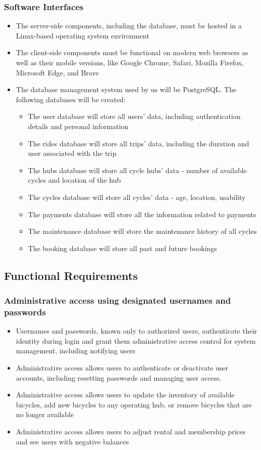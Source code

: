 \documentclass[11pt]{article}
\begin{document}
\subsubsection{Software Interfaces}
\begin{itemize}
    \item The server-side components, including the database, must be hosted in a Linux-based operating system environment
    \item The client-side components must be functional on modern web browsers as well as their mobile versions, like Google Chrome, Safari, Mozilla Firefox, Microsoft Edge, and Brave
    \item The database management system used by us will be PostgreSQL. The following databases will be created:
    \begin{itemize}
        \item The user database will store all users’ data, including authentication details and personal information
        \item The rides database will store all trips’ data, including the duration and user associated with the trip
        \item The hubs database will store all cycle hubs’ data - number of available cycles and location of the hub
        \item The cycles database will store all cycles’ data - age, location, usability
        \item The payments database will store all the information related to payments
        \item The maintenance database will store the maintenance history of all cycles
        \item The booking database will store all past and future bookings
    \end{itemize}
\end{itemize}

\subsection{Functional Requirements}
\subsubsection{Administrative access using designated usernames and passwords}
\begin{itemize}
    \item Usernames and passwords, known only to authorized users, authenticate their identity during login and grant them administrative access control for system management, including notifying users
    \item Administrative access allows users to authenticate or deactivate user accounts, including resetting passwords and managing user access.
    \item Administrative access allows users to update the inventory of available bicycles, add new bicycles to any operating hub, or remove bicycles that are no longer available
    \item Administrative access allows users to adjust rental and membership prices and see users with negative balances
\end{itemize}
\end{document}

